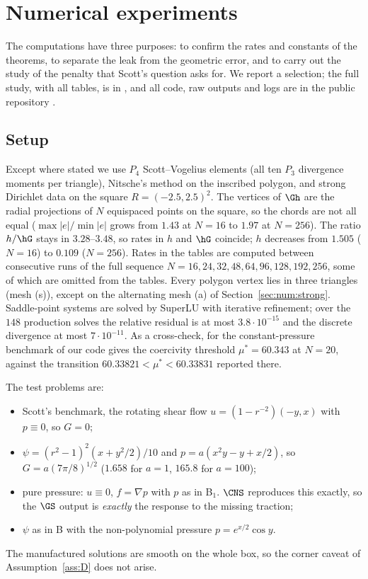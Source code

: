 \section{Numerical experiments}\label{sec:numerics}

The computations have three purposes: to confirm the rates and constants of the theorems, to separate the leak from the geometric error, and to carry out the study of the penalty that Scott's question asks for. We report a selection; the full study, with all tables, is in \cite{PadhiExt}, and all code, raw outputs and logs are in the public repository \cite{ZeroGradRepo}.

\subsection{Setup}
Except where stated we use $P_4$ Scott--Vogelius elements (all ten $P_3$ divergence moments per triangle), Nitsche's method on the inscribed polygon, and strong Dirichlet data on the square $R=(-2.5,2.5)^2$. The vertices of $\Gh$ are the radial projections of $N$ equispaced points on the square, so the chords are not all equal ($\max|e|/\min|e|$ grows from $1.43$ at $N=16$ to $1.97$ at $N=256$). The ratio $h/\hG$ stays in $3.28$--$3.48$, so rates in $h$ and $\hG$ coincide; $h$ decreases from $1.505$ ($N=16$) to $0.109$ ($N=256$). Rates in the tables are computed between consecutive runs of the full sequence $N=16,24,32,48,64,96,128,192,256$, some of which are omitted from the tables. Every polygon vertex lies in three triangles (mesh (s)), except on the alternating mesh (a) of Section~\ref{sec:num:strong}. Saddle-point systems are solved by SuperLU \cite{SuperLU} with iterative refinement; over the $148$ production solves the relative residual is at most $3.8\cdot10^{-15}$ and the discrete divergence at most $7\cdot10^{-11}$. As a cross-check, for the constant-pressure benchmark of \cite{Cavalcante} our code gives the coercivity threshold $\mu^\ast=60.343$ at $N=20$, against the transition $60.33821<\mu^\ast<60.33831$ reported there.

The test problems are:
\begin{itemize}
\item[\textbf{A}] Scott's benchmark, the rotating shear flow $u=(1-r^{-2})(-y,x)$ with $p\equiv0$, so $G=0$;
\item[\textbf{B$_a$}] $\psi=(r^2-1)^2(x+y^2/2)/10$ and $p=a(x^2y-y+x/2)$, so $G=a(7\pi/8)^{1/2}$ ($1.658$ for $a=1$, $165.8$ for $a=100$);
\item[\textbf{P}] pure pressure: $u\equiv0$, $f=\nabla p$ with $p$ as in B$_1$. $\CNS$ reproduces this exactly, so the $\GS$ output is \emph{exactly} the response to the missing traction;
\item[\textbf{C}] $\psi$ as in B with the non-polynomial pressure $p=e^{x/2}\cos y$.
\end{itemize}
The manufactured solutions are smooth on the whole box, so the corner caveat of Assumption~\ref{ass:D} does not arise.

